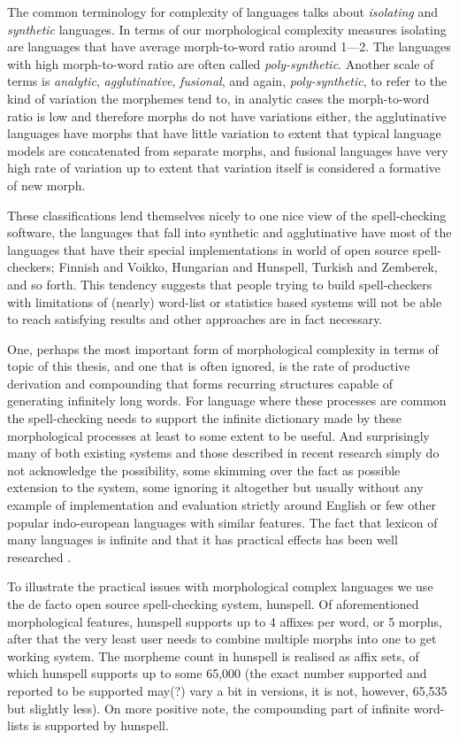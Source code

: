 \documentclass[officiallayout,draft]{unihelcompling}
\begin{document}
The common terminology for complexity of languages talks about \emph{isolating}
and \emph{synthetic} languages. In terms of our morphological complexity
measures isolating are languages that have average morph-to-word ratio around
1---2. The languages with high morph-to-word ratio are often called
\emph{poly-synthetic}. Another scale of terms is \emph{analytic},
\emph{agglutinative}, \emph{fusional}, and again, \emph{poly-synthetic}, to
refer to the kind of variation the morphemes tend to, in analytic cases the
morph-to-word ratio is low and therefore morphs do not have variations either,
the agglutinative languages have morphs that have little variation to extent
that typical language models are concatenated from separate morphs, and
fusional languages have very high rate of variation up to extent that variation
itself is considered a formative of new morph. 

These classifications lend themselves nicely to one nice view of the
spell-checking software, the languages that fall into synthetic and
agglutinative have most of the languages that have their special
implementations in world of open source spell-checkers; Finnish and Voikko,
Hungarian and Hunspell, Turkish and Zemberek, and so forth.  This tendency
suggests that people trying to build spell-checkers with limitations of
(nearly) word-list or statistics based systems will not be able to reach
satisfying results and other approaches are in fact necessary.

One, perhaps the most important form of morphological complexity in terms of
topic of this thesis, and one that is often ignored, is the rate of productive
derivation and compounding that forms recurring structures capable of
generating infinitely long words. For language where these processes are common
the spell-checking needs to support the infinite dictionary made by these
morphological processes at least to some extent to be useful. And surprisingly
many of both existing systems and those described in recent research simply do
not acknowledge the possibility\cite{}, some skimming over the fact as possible
extension to the system, some ignoring it altogether but usually without any
example of implementation and evaluation strictly around English or few other
popular indo-european languages with similar features.  The fact that lexicon
of many languages is infinite and that it has practical effects has been well
researched \cite{kornai2002many}.

To illustrate the practical issues with morphological complex languages we use
the de facto open source spell-checking system, hunspell. Of aforementioned
morphological features, hunspell supports up to 4 affixes per word, or 5
morphs, after that the very least user needs to combine multiple morphs into
one to get working system. The morpheme count in hunspell is realised as affix
sets, of which hunspell supports up to some 65,000 (the exact number supported
and reported to be supported may(?) vary a bit in
versions, it is not, however, 65,535 but slightly less). On more positive
note, the compounding part of infinite word-lists is supported by hunspell.
\end{document}
